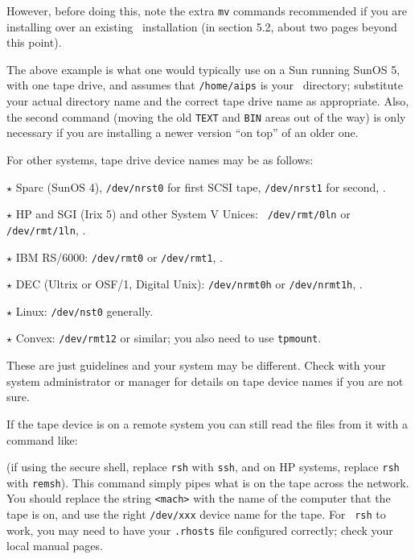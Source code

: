 \noindent However, before doing this, note the extra {\tt mv} commands
recommended if you are installing over an existing \AIPS\ installation
(in section 5.2,
about two pages beyond this point).

The above example is what one would typically use on a Sun running SunOS
5, with one tape drive, and assumes that {\tt /home/aips} is your
\AROOT\ directory; substitute your actual directory name and the correct
tape drive name as appropriate.  Also, the second command (moving the
old {\tt TEXT} and {\tt BIN} areas out of the way) is only necessary if
you are installing a newer version ``on top'' of an older one.


For other systems, tape drive device names may be as follows:\medskip

\item{$\star$}  Sparc (SunOS 4), {\tt /dev/nrst0} for first SCSI tape,
        {\tt /dev/nrst1} for second, \etc.
\item{$\star$}  HP and SGI (Irix 5) and other System V Unices: {\tt
        /dev/rmt/0ln} or {\tt /dev/rmt/1ln}, \etc.
\item{$\star$}  IBM RS/6000: {\tt /dev/rmt0} or {\tt /dev/rmt1}, \etc.
\item{$\star$}  DEC (Ultrix or OSF/1, Digital Unix): {\tt /dev/nrmt0h}
                or {\tt /dev/nrmt1h}, \etc.
\item{$\star$}  Linux: {\tt /dev/nst0} generally.
\item{$\star$}  Convex: {\tt /dev/rmt12} or similar; you also need to
                use {\tt tpmount}.
\medskip

\noindent These are just guidelines and your system may be different.
Check with your system administrator or manager for details on tape
device names if you are not sure.

If the tape device is on a remote system you can still read the files
from it with a command like:\medskip

\medskip

\noindent (if using the secure shell, replace {\tt rsh} with {\tt ssh},
and on HP systems, replace {\tt rsh} with {\tt remsh}).  This command
simply pipes what is on the tape across the network.  You should replace
the string {\tt <mach>} with the name of the computer that the tape is
on, and use the right {\tt /dev/xxx} device name for the tape.  For {\tt
rsh} to work, you may need to have your {\tt .rhosts} file configured
correctly; check your local manual pages.


